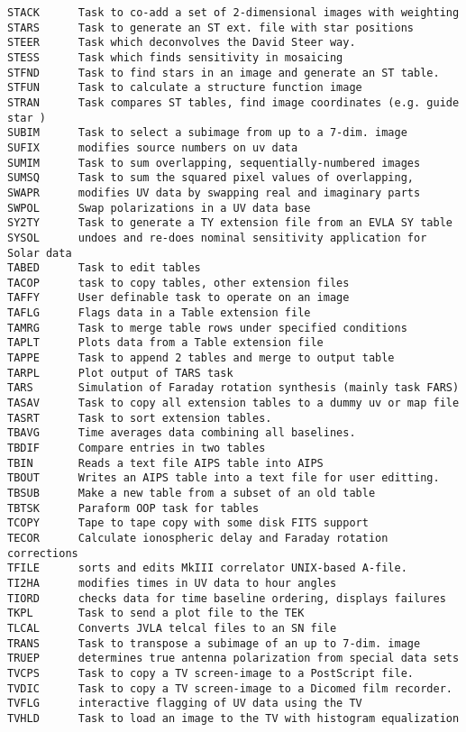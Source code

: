 \begin{verbatim}
STACK      Task to co-add a set of 2-dimensional images with weighting
STARS      Task to generate an ST ext. file with star positions
STEER      Task which deconvolves the David Steer way.
STESS      Task which finds sensitivity in mosaicing
STFND      Task to find stars in an image and generate an ST table.
STFUN      Task to calculate a structure function image
STRAN      Task compares ST tables, find image coordinates (e.g. guide star )
SUBIM      Task to select a subimage from up to a 7-dim. image
SUFIX      modifies source numbers on uv data
SUMIM      Task to sum overlapping, sequentially-numbered images
SUMSQ      Task to sum the squared pixel values of overlapping,
SWAPR      modifies UV data by swapping real and imaginary parts
SWPOL      Swap polarizations in a UV data base
SY2TY      Task to generate a TY extension file from an EVLA SY table
SYSOL      undoes and re-does nominal sensitivity application for Solar data
TABED      Task to edit tables
TACOP      task to copy tables, other extension files
TAFFY      User definable task to operate on an image
TAFLG      Flags data in a Table extension file
TAMRG      Task to merge table rows under specified conditions
TAPLT      Plots data from a Table extension file
TAPPE      Task to append 2 tables and merge to output table
TARPL      Plot output of TARS task
TARS       Simulation of Faraday rotation synthesis (mainly task FARS)
TASAV      Task to copy all extension tables to a dummy uv or map file
TASRT      Task to sort extension tables.
TBAVG      Time averages data combining all baselines.
TBDIF      Compare entries in two tables
TBIN       Reads a text file AIPS table into AIPS
TBOUT      Writes an AIPS table into a text file for user editting.
TBSUB      Make a new table from a subset of an old table
TBTSK      Paraform OOP task for tables
TCOPY      Tape to tape copy with some disk FITS support
TECOR      Calculate ionospheric delay and Faraday rotation corrections
TFILE      sorts and edits MkIII correlator UNIX-based A-file.
TI2HA      modifies times in UV data to hour angles
TIORD      checks data for time baseline ordering, displays failures
TKPL       Task to send a plot file to the TEK
TLCAL      Converts JVLA telcal files to an SN file
TRANS      Task to transpose a subimage of an up to 7-dim. image
TRUEP      determines true antenna polarization from special data sets
TVCPS      Task to copy a TV screen-image to a PostScript file.
TVDIC      Task to copy a TV screen-image to a Dicomed film recorder.
TVFLG      interactive flagging of UV data using the TV
TVHLD      Task to load an image to the TV with histogram equalization

\end{verbatim}

